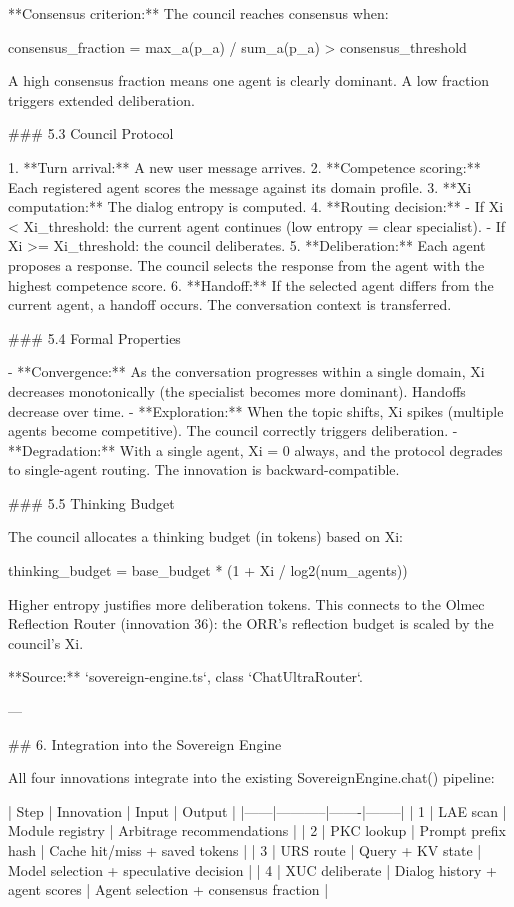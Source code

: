 **Consensus criterion:** The council reaches consensus when:

consensus_fraction = max_a(p_a) / sum_a(p_a) > consensus_threshold

A high consensus fraction means one agent is clearly dominant. A low fraction triggers extended deliberation.

### 5.3 Council Protocol

1. **Turn arrival:** A new user message arrives.
2. **Competence scoring:** Each registered agent scores the message against its domain profile.
3. **Xi computation:** The dialog entropy is computed.
4. **Routing decision:**
   - If Xi < Xi_threshold: the current agent continues (low entropy = clear specialist).
   - If Xi >= Xi_threshold: the council deliberates.
5. **Deliberation:** Each agent proposes a response. The council selects the response from the agent with the highest competence score.
6. **Handoff:** If the selected agent differs from the current agent, a handoff occurs. The conversation context is transferred.

### 5.4 Formal Properties

- **Convergence:** As the conversation progresses within a single domain, Xi decreases monotonically (the specialist becomes more dominant). Handoffs decrease over time.
- **Exploration:** When the topic shifts, Xi spikes (multiple agents become competitive). The council correctly triggers deliberation.
- **Degradation:** With a single agent, Xi = 0 always, and the protocol degrades to single-agent routing. The innovation is backward-compatible.

### 5.5 Thinking Budget

The council allocates a thinking budget (in tokens) based on Xi:

thinking_budget = base_budget * (1 + Xi / log2(num_agents))

Higher entropy justifies more deliberation tokens. This connects to the Olmec Reflection Router (innovation 36): the ORR's reflection budget is scaled by the council's Xi.

**Source:** `sovereign-engine.ts`, class `ChatUltraRouter`.

---

## 6. Integration into the Sovereign Engine

All four innovations integrate into the existing SovereignEngine.chat() pipeline:

| Step | Innovation | Input | Output |
|------|-----------|-------|--------|
| 1 | LAE scan | Module registry | Arbitrage recommendations |
| 2 | PKC lookup | Prompt prefix hash | Cache hit/miss + saved tokens |
| 3 | URS route | Query + KV state | Model selection + speculative decision |
| 4 | XUC deliberate | Dialog history + agent scores | Agent selection + consensus fraction |

